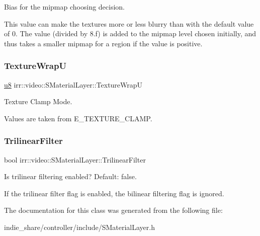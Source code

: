 Bias for the mipmap choosing decision. 

This value can make the textures more or less blurry than with the default value of 0. The value (divided by 8.\+f) is added to the mipmap level chosen initially, and thus takes a smaller mipmap for a region if the value is positive. \mbox{\label{classirr_1_1video_1_1SMaterialLayer_afb8408075afd8e84c8ff7c46f7a899bb}} 
\subsubsection{\texorpdfstring{Texture\+WrapU}{TextureWrapU}}
{\footnotesize\ttfamily \hyperlink{namespaceirr_a646874f69af8ff87fc10201b0254a761}{u8} irr\+::video\+::\+S\+Material\+Layer\+::\+Texture\+WrapU}



Texture Clamp Mode. 

Values are taken from E\+\_\+\+T\+E\+X\+T\+U\+R\+E\+\_\+\+C\+L\+A\+MP. \mbox{\label{classirr_1_1video_1_1SMaterialLayer_ad1b093b1a8e26cb10156a02ac78bdf67}} 
\subsubsection{\texorpdfstring{Trilinear\+Filter}{TrilinearFilter}}
{\footnotesize\ttfamily bool irr\+::video\+::\+S\+Material\+Layer\+::\+Trilinear\+Filter}



Is trilinear filtering enabled? Default\+: false. 

If the trilinear filter flag is enabled, the bilinear filtering flag is ignored. 

The documentation for this class was generated from the following file\+:\begin{DoxyCompactItemize}
\item 
indie\+\_\+share/controller/include/S\+Material\+Layer.\+h\end{DoxyCompactItemize}
